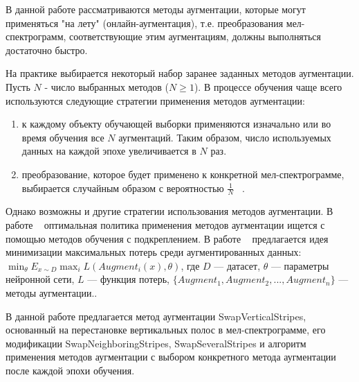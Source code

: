\documentclass[12pt, fleqn]{article}
\begin{document}
В данной работе рассматриваются методы аугментации, которые могут применяться "на лету" (онлайн-аугментация), т.е. преобразования мел-спектрограмм, соответствующие этим аугментациям, должны выполняться достаточно быстро.

На практике выбирается некоторый набор заранее заданных методов аугментации. Пусть $N$ - число выбранных методов ($N \geq 1$). В процессе обучения чаще всего используются следующие стратегии применения методов аугментации:
\begin{enumerate}
    \item к каждому объекту обучающей выборки применяются изначально или во время обучения все $N$ аугментаций. Таким образом, число используемых данных на каждой эпохе увеличивается в $N$ раз.
    \item преобразование, которое будет применено к конкретной мел-спектрограмме, выбирается случайным образом с вероятностью $\frac{1}{N}$ ~\cite{RandAugment}.
\end{enumerate}
Однако возможны и другие стратегии использования методов аугментации. В работе ~\cite{AutoAugment} оптимальная политика применения методов аугментации ищется с помощью методов обучения с подкреплением. В работе ~\cite{MaxUp} предлагается идея минимизации максимальных потерь среди аугментированных данных: \newline
$\min_{\theta} E_{x \sim D} \max_i L(Augment_i(x), \theta)$, где \newline
$D$ --- датасет, \newline
$\theta$ --- параметры нейронной сети, \newline
$L$ --- функция потерь, \newline
$\{Augment_1, Augment_2, ..., Augment_n\}$ --- методы аугментации..

В данной работе предлагается метод аугментации SwapVerticalStripes, основанный на перестановке вертикальных полос в мел-спектрограмме, его модификации SwapNeighboringStripes, SwapSeveralStripes и алгоритм применения методов аугментации с выбором конкретного метода аугментации после каждой эпохи обучения.
\end{document}
